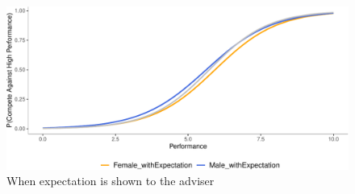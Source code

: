 \documentclass[
  man,floatsintext]{apa6}
\begin{document}
\begin{table}

\caption{\label{tab:study1regs}Advice of competing against High Performance group, based on the gender of targets and whether their expectation is shown to adviser (Column 1). Column 2 show the results where standard errors are clusterd at the level of adviser. Expeccted Bonus of advice received, based on the gender of targets and whether their expectation is shown to adviser (Column 3)}
\centering
{}
\end{table}

\begin{figure}

{\centering \includegraphics{Advice-Giving_files/figure-latex/study1gender-1} 

}

\caption{When expectation is shown to the adviser}\label{fig:study1gender}
\end{figure}
\end{document}
